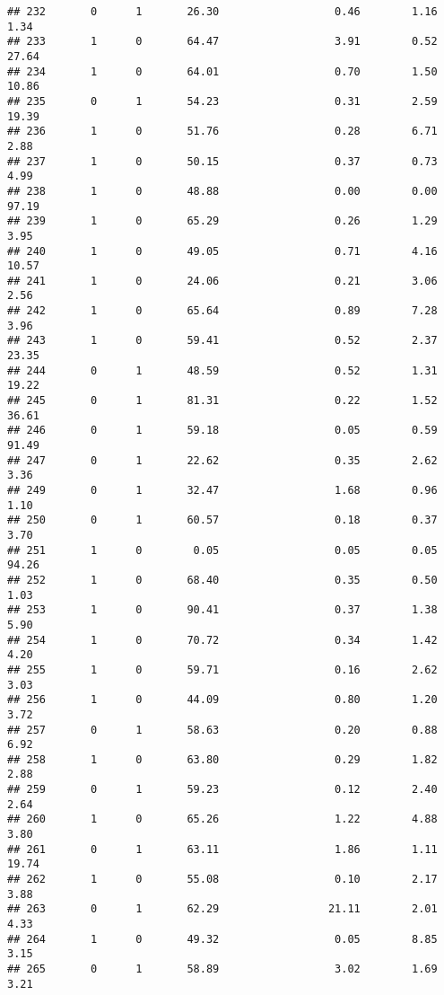 \documentclass[
]{article}
\begin{document}
\begin{verbatim}
## 232       0      1       26.30                  0.46        1.16        1.34
## 233       1      0       64.47                  3.91        0.52       27.64
## 234       1      0       64.01                  0.70        1.50       10.86
## 235       0      1       54.23                  0.31        2.59       19.39
## 236       1      0       51.76                  0.28        6.71        2.88
## 237       1      0       50.15                  0.37        0.73        4.99
## 238       1      0       48.88                  0.00        0.00       97.19
## 239       1      0       65.29                  0.26        1.29        3.95
## 240       1      0       49.05                  0.71        4.16       10.57
## 241       1      0       24.06                  0.21        3.06        2.56
## 242       1      0       65.64                  0.89        7.28        3.96
## 243       1      0       59.41                  0.52        2.37       23.35
## 244       0      1       48.59                  0.52        1.31       19.22
## 245       0      1       81.31                  0.22        1.52       36.61
## 246       0      1       59.18                  0.05        0.59       91.49
## 247       0      1       22.62                  0.35        2.62        3.36
## 249       0      1       32.47                  1.68        0.96        1.10
## 250       0      1       60.57                  0.18        0.37        3.70
## 251       1      0        0.05                  0.05        0.05       94.26
## 252       1      0       68.40                  0.35        0.50        1.03
## 253       1      0       90.41                  0.37        1.38        5.90
## 254       1      0       70.72                  0.34        1.42        4.20
## 255       1      0       59.71                  0.16        2.62        3.03
## 256       1      0       44.09                  0.80        1.20        3.72
## 257       0      1       58.63                  0.20        0.88        6.92
## 258       1      0       63.80                  0.29        1.82        2.88
## 259       0      1       59.23                  0.12        2.40        2.64
## 260       1      0       65.26                  1.22        4.88        3.80
## 261       0      1       63.11                  1.86        1.11       19.74
## 262       1      0       55.08                  0.10        2.17        3.88
## 263       0      1       62.29                 21.11        2.01        4.33
## 264       1      0       49.32                  0.05        8.85        3.15
## 265       0      1       58.89                  3.02        1.69        3.21

\end{verbatim}
\end{document}
